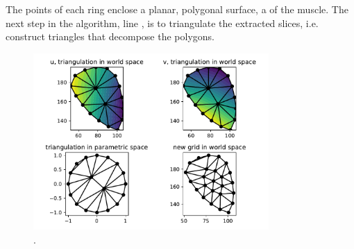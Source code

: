 The points of each ring enclose a planar, polygonal surface, a  of the muscle.
The next step in the algorithm, line , is to triangulate the extracted slices, i.e. construct triangles that decompose the polygons.

\begin{figure}%
  \centering%
  \includegraphics[width=0.8\textwidth]{images/fiber_creation/harmonic_map_9.pdf}%
  \caption{.}%
  \label{fig:harmonic_map}%
\end{figure}%
%
